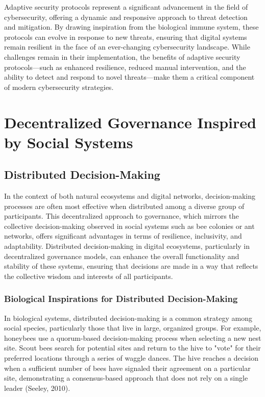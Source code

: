 \documentclass[12pt,twoside]{article}
\begin{document}
Adaptive security protocols represent a significant advancement in the field of cybersecurity, offering a dynamic and responsive approach to threat detection and mitigation. By drawing inspiration from the biological immune system, these protocols can evolve in response to new threats, ensuring that digital systems remain resilient in the face of an ever-changing cybersecurity landscape. While challenges remain in their implementation, the benefits of adaptive security protocols—such as enhanced resilience, reduced manual intervention, and the ability to detect and respond to novel threats—make them a critical component of modern cybersecurity strategies.

\section{Decentralized Governance Inspired by Social Systems}

\subsection{Distributed Decision-Making}

In the context of both natural ecosystems and digital networks, decision-making processes are often most effective when distributed among a diverse group of participants. This decentralized approach to governance, which mirrors the collective decision-making observed in social systems such as bee colonies or ant networks, offers significant advantages in terms of resilience, inclusivity, and adaptability. Distributed decision-making in digital ecosystems, particularly in decentralized governance models, can enhance the overall functionality and stability of these systems, ensuring that decisions are made in a way that reflects the collective wisdom and interests of all participants.

\subsubsection{Biological Inspirations for Distributed Decision-Making}

In biological systems, distributed decision-making is a common strategy among social species, particularly those that live in large, organized groups. For example, honeybees use a quorum-based decision-making process when selecting a new nest site. Scout bees search for potential sites and return to the hive to "vote" for their preferred locations through a series of waggle dances. The hive reaches a decision when a sufficient number of bees have signaled their agreement on a particular site, demonstrating a consensus-based approach that does not rely on a single leader (Seeley, 2010).
\end{document}
